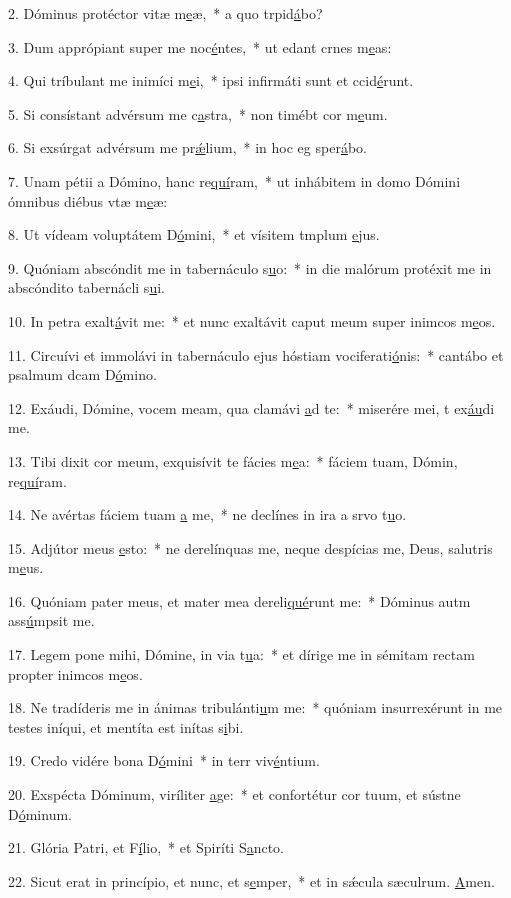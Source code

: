 2. Dóminus protéctor vitæ m\uline{e}æ,~* a quo trpid\uline{á}bo?\par 
3. Dum apprópiant super me noc\uline{é}ntes,~* ut edant crnes m\uline{e}as:\par 
4. Qui tríbulant me inimíci m\uline{e}i,~* ipsi infirmáti sunt et ccid\uline{é}runt.\par 
5. Si consístant advérsum me c\uline{a}stra,~* non timébt cor m\uline{e}um.\par 
6. Si exsúrgat advérsum me pr\uline{ǽ}lium,~* in hoc eg sper\uline{á}bo.\par 
7. Unam pétii a Dómino, hanc re\uline{quí}ram,~* ut inhábitem in domo Dómini ómnibus diébus vtæ m\uline{e}æ:\par 
8. Ut vídeam voluptátem D\uline{ó}mini,~* et vísitem tmplum \uline{e}jus.\par 
9. Quóniam abscóndit me in tabernáculo s\uline{u}o:~* in die malórum protéxit me in abscóndito tabernácli s\uline{u}i.\par 
10. In petra exalt\uline{á}vit me:~* et nunc exaltávit caput meum super inimcos m\uline{e}os.\par 
11. Circuívi et immolávi in tabernáculo ejus hóstiam vociferati\uline{ó}nis:~* cantábo et psalmum dcam D\uline{ó}mino.\par 
12. Exáudi, Dómine, vocem meam, qua clamávi \uline{a}d te:~* miserére mei, t ex\uline{áu}di me.\par 
13. Tibi dixit cor meum, exquisívit te fácies m\uline{e}a:~* fáciem tuam, Dómin, re\uline{quí}ram.\par 
14. Ne avértas fáciem tuam \uline{a} me,~* ne declínes in ira a srvo t\uline{u}o.\par 
15. Adjútor meus \uline{e}sto:~* ne derelínquas me, neque despícias me, Deus, salutris m\uline{e}us.\par 
16. Quóniam pater meus, et mater mea dereli\uline{qué}runt me:~* Dóminus autm ass\uline{ú}mpsit me.\par 
17. Legem pone mihi, Dómine, in via t\uline{u}a:~* et dírige me in sémitam rectam propter inimcos m\uline{e}os.\par 
18. Ne tradíderis me in ánimas tribulánti\uline{u}m me:~* quóniam insurrexérunt in me testes iníqui, et mentíta est inítas s\uline{i}bi.\par 
19. Credo vidére bona D\uline{ó}mini~* in terr viv\uline{é}ntium.\par 
20. Exspécta Dóminum, viríliter \uline{a}ge:~* et confortétur cor tuum, et sústne D\uline{ó}minum.\par 
21. Glória Patri, et F\uline{í}lio,~* et Spiríti S\uline{a}ncto.\par 
22. Sicut erat in princípio, et nunc, et s\uline{e}mper,~* et in sǽcula sæculrum. \uline{A}men.\par 
